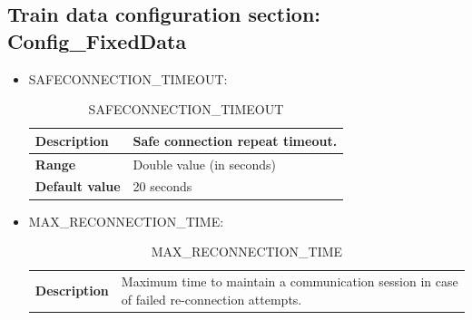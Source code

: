\subsection{Train data configuration section: Config\_FixedData}
	\begin{itemize}
			\item SAFECONNECTION\_TIMEOUT:

			\begin{longtable}{|l|l|}
				\caption{SAFECONNECTION\_TIMEOUT}\\
				\hline

					\begin{minipage}[t]{0.22\linewidth} \textbf{Description}	\end{minipage}
				&	\begin{minipage}[t]{0.78\linewidth} Safe connection repeat timeout. \end{minipage} \\

				\hline

					\begin{minipage}[t]{0.22\linewidth} \textbf{Range}	\end{minipage}
				&	\begin{minipage}[t]{0.78\linewidth} Double value (in seconds) \end{minipage} \\

				\hline

					\begin{minipage}[t]{0.22\linewidth} \textbf{Default value}	\end{minipage}
				&	\begin{minipage}[t]{0.78\linewidth} 20 seconds \end{minipage} \\

				\hline
			\end{longtable}
			\item MAX\_RECONNECTION\_TIME:

			\begin{longtable}{|l|l|}
				\caption{MAX\_RECONNECTION\_TIME}\\
				\hline

					\begin{minipage}[t]{0.22\linewidth} \textbf{Description}	\end{minipage}
				&	\begin{minipage}[t]{0.78\linewidth} Maximum time to maintain a communication session in case of failed re-connection attempts. \end{minipage} \\


\end{longtable}
\end{itemize}

